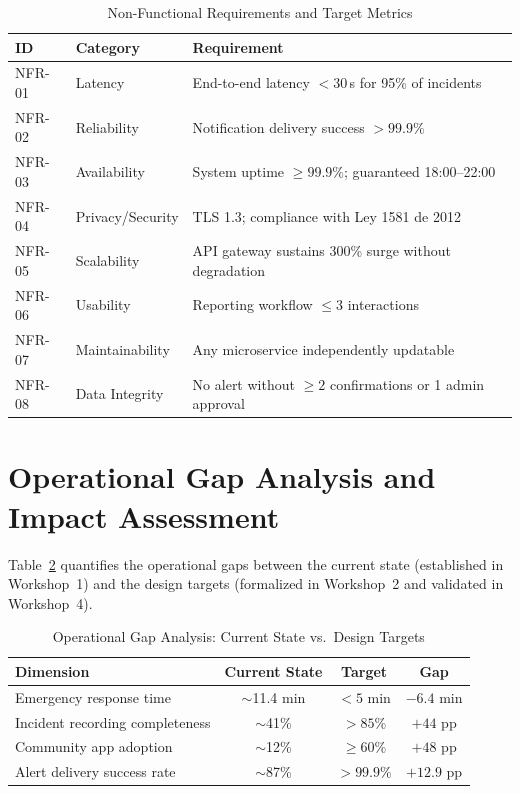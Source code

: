 \documentclass[11pt,a4paper]{article}
\begin{document}
\begin{table}[H]
\centering
\caption{Non-Functional Requirements and Target Metrics}
\label{tab:nfr}
\small
\begin{tabularx}{\textwidth}{l l X}
\toprule
\textbf{ID} & \textbf{Category} & \textbf{Requirement} \\
\midrule
NFR-01 & Latency & End-to-end latency $<30$\,s for 95\% of incidents \\
NFR-02 & Reliability & Notification delivery success $>99.9\%$ \\
NFR-03 & Availability & System uptime $\geq99.9\%$; guaranteed 18:00--22:00 \\
NFR-04 & Privacy/Security & TLS 1.3; compliance with Ley 1581 de 2012~\cite{ley1581} \\
NFR-05 & Scalability & API gateway sustains 300\% surge without degradation \\
NFR-06 & Usability & Reporting workflow $\leq3$ interactions \\
NFR-07 & Maintainability & Any microservice independently updatable \\
NFR-08 & Data Integrity & No alert without $\geq2$ confirmations or 1 admin approval \\
\bottomrule
\end{tabularx}
\end{table}


\section{Operational Gap Analysis and Impact Assessment}

Table~\ref{tab:gap} quantifies the operational gaps between the current state (established in Workshop~1) and the design targets (formalized in Workshop~2 and validated in Workshop~4).

\begin{table}[H]
\centering
\caption{Operational Gap Analysis: Current State vs.\ Design Targets}
\label{tab:gap}
\small
\begin{tabular}{l c c c}
\toprule
\textbf{Dimension} & \textbf{Current State} & \textbf{Target} & \textbf{Gap} \\
\midrule
Emergency response time & $\sim$11.4 min & $<5$ min & $-6.4$ min \\
Incident recording completeness & $\sim$41\% & $>85\%$ & $+44$ pp \\
Community app adoption & $\sim$12\% & $\geq60\%$ & $+48$ pp \\
Alert delivery success rate & $\sim$87\% & $>99.9\%$ & $+12.9$ pp \\
\bottomrule
\end{tabular}
\end{table}
\end{document}
